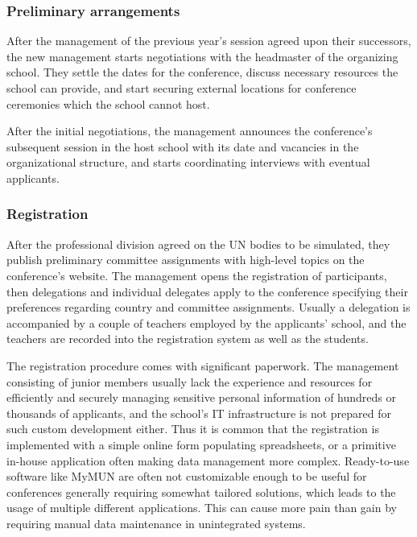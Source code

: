 \subsubsection{Preliminary arrangements}

After the management of the previous year's session agreed upon their successors, the new management starts negotiations with the headmaster of the organizing school. They settle the dates for the conference, discuss necessary resources the school can provide, and start securing external locations for conference ceremonies which the school cannot host.

After the initial negotiations, the management announces the conference's subsequent session in the host school with its date and vacancies in the organizational structure, and starts coordinating interviews with eventual applicants.

\subsubsection{Registration}

After the professional division agreed on the UN bodies to be simulated, they publish preliminary committee assignments with high-level topics on the conference's website. The management opens the registration of participants, then delegations and individual delegates apply to the conference specifying their preferences regarding country and committee assignments. Usually a delegation is accompanied by a couple of teachers employed by the applicants' school, and the teachers are recorded into the registration system as well as the students.

The registration procedure comes with significant paperwork. The management consisting of junior members usually lack the experience and resources for efficiently and securely managing sensitive personal information of hundreds or thousands of applicants, and the school's IT infrastructure is not prepared for such custom development either. Thus it is common that the registration is implemented with a simple online form populating spreadsheets, or a primitive in-house application often making data management more complex. Ready-to-use software like MyMUN are often not customizable enough to be useful for conferences generally requiring somewhat tailored solutions, which leads to the usage of multiple different applications. This can cause more pain than gain by requiring manual data maintenance in unintegrated systems.

